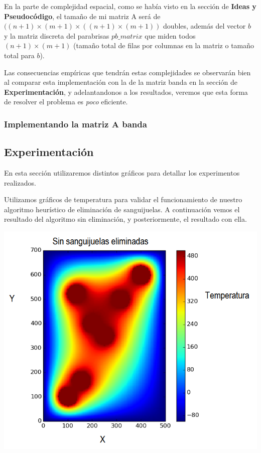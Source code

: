 En la parte de complejidad espacial, como se había visto en la sección de \textbf{Ideas y Pseudocódigo}, el tamaño de mi matriz A será de $((n+1) \times (m+1) \times ((n+1) \times (m+1))$ doubles, además del vector $b$ y la matriz discreta del parabrisas $pb\_matrix$ que miden todos $(n+1) \times (m+1)$ (tamaño total de filas por columnas en la matriz o tamaño total para $b$).

Las consecuencias empíricas que tendrán estas complejidades se observarán bien al comparar esta implementación con la de la matriz banda en la sección de \textbf{Experimentación}, y adelantandonos a los resultados, veremos que esta forma de resolver el problema es \textit{poco} eficiente.

\subsubsection{Implementando la matriz A banda}

\subsection{Experimentación}

	En esta sección utilizaremos distintos gráficos para detallar los experimentos realizados. 

	Utilizamos gráficos de temperatura para validar el funcionamiento de nuestro algoritmo heurístico de eliminación de sanguijuelas. A continuación vemos el resultado del algoritmo sin eliminación, y posteriormente, el resultado con ella.

	\begin{center}
		\includegraphics[scale=0.5]{./img/test5_sinkill.png}
	\end{center}

